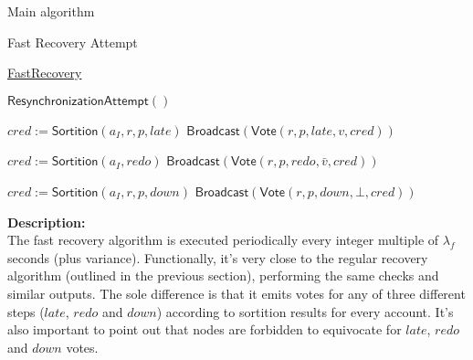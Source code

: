 \documentclass[10pt,a4paper]{article}
\begin{document}
\begin{section}{Main algorithm}
\begin{subsection}{Fast Recovery Attempt}\label{ssect:FastRecovery}

    \begin{algorithm}[H]
        \caption{\underline{FastRecovery}}
        \label{algo:fast-recovery}
        \begin{algorithmic}[1]


        \State $\mathsf{ResynchronizationAttempt}()$
    
                \State $cred := \mathsf{Sortition}(a_{I}, r,p,late)$
                    \State $\mathsf{Broadcast}(\mathsf{Vote}(r, p, late, v, cred))$
                \EndIf

                    \State $cred := 
                    \mathsf{Sortition}(a_{I}, redo)$
                        \State $\mathsf{Broadcast}(\mathsf{Vote}(r,p,redo,\bar{v}, cred))$
                    \EndIf

            \Else
                \State $cred := 
                \mathsf{Sortition}(a_{I}, r,p, down)$
                    \State $\mathsf{Broadcast}(\mathsf{Vote}(r,p,down,\bot, cred))$
                \EndIf
            \EndIf
        \EndFor

        \EndFunction
        \end{algorithmic}
    \end{algorithm}
    
    
    \noindent \textbf{Description:}\\
    The fast recovery algorithm is executed periodically every integer multiple of $\lambda_f$
    seconds (plus variance).
    Functionally, it's very close to the regular recovery algorithm (outlined in the previous section), 
    performing the same checks and similar outputs. The sole difference is that it emits votes 
    for any of three different steps ($late$, $redo$ and $down$) according to sortition 
    results for every account.
    It's also important to point out that nodes are forbidden to equivocate for $late$, $redo$ and $down$ votes.
\end{subsection}


\end{section}
\end{document}
